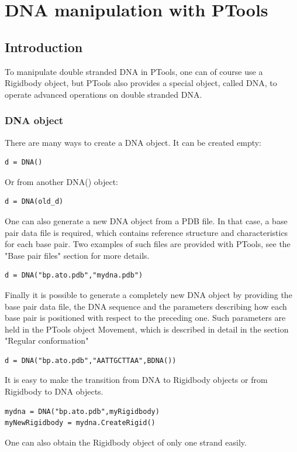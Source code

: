 \documentclass[12pt,a4paper]{article}
\begin{document}
\newpage
\section{DNA manipulation with PTools}

\subsection{Introduction}

To manipulate double stranded DNA in PTools, one can of course use a Rigidbody object, but PTools also provides a special object, called DNA, to operate advanced operations on double stranded DNA.

\subsubsection{DNA object}
There are many ways to create a DNA object. It can be created empty:
\begin{verbatim}
d = DNA()
\end{verbatim}
Or from another DNA() object:
\begin{verbatim}
d = DNA(old_d)
\end{verbatim}
One can also generate a new DNA object from a PDB file. 
In that case, a base pair data file is required, which contains reference structure and characteristics for each base pair.  
Two examples of such files are provided with PTools, see the "Base pair files" section for more details.
\begin{verbatim}
d = DNA("bp.ato.pdb","mydna.pdb")
\end{verbatim}       
Finally it is possible to generate a completely new DNA object by providing the base pair data file, the DNA sequence and the parameters describing how each base pair is positioned with respect to the preceding one. Such parameters are held in the PTools object Movement, which is described in detail in the section "Regular conformation" 
\begin{verbatim}
d = DNA("bp.ato.pdb","AATTGCTTAA",BDNA())
\end{verbatim} 

It is easy to make the transition from DNA to Rigidbody objects or from Rigidbody to DNA objects.

\begin{verbatim}
mydna = DNA("bp.ato.pdb",myRigidbody)
myNewRigidbody = mydna.CreateRigid() 
\end{verbatim} 

One can also obtain the Rigidbody object of only one strand easily.
\end{document}
